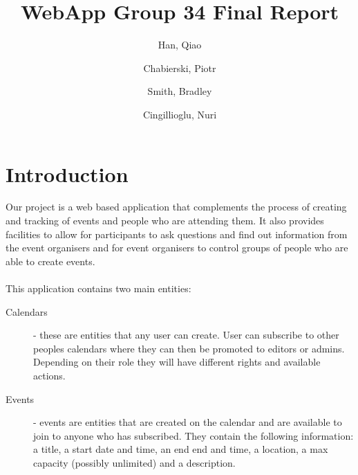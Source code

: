 \documentclass[10pt,a4paper]{article}
\begin{document}
\title{WebApp Group 34 Final Report}
\author{
  Han, Qiao\\
  \and
  Chabierski, Piotr\\
  \and
  Smith, Bradley\\
  \and
  Cingillioglu, Nuri\\
}

\maketitle

\section{Introduction}
Our project is a web based application that complements the process of creating 
and tracking of events and people who are attending them. It also provides 
facilities to allow for participants to ask questions and find out information 
from the event organisers and for event organisers to control groups of people 
who are able to create events. 
\\
\\
\noindent This application contains two main entities:
\begin{description}
\item[Calendars] - these are entities that any user can create. User can 
subscribe to other peoples calendars where they can then be promoted to editors 
or admins. Depending on their role they will have different rights and available 
actions.
\item[Events] - events are entities that are created on the calendar and are 
available to join to anyone who has subscribed. They contain the following 
information: a title, a start date and time, an end end and time, a location, a 
max capacity (possibly unlimited) and a description.
\end{description}
\end{document}
